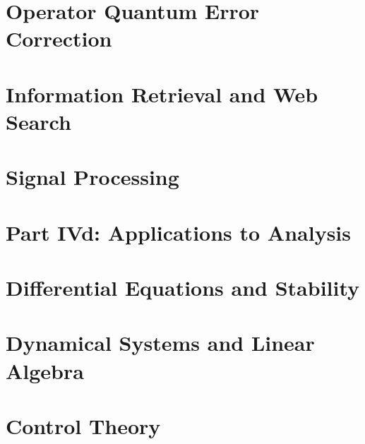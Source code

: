 \documentclass[a4paper]{article}
\begin{document}
\section{Operator Quantum Error Correction}

\section{Information Retrieval and Web Search}

\section{Signal Processing}

\section*{Part IVd: Applications to Analysis}

\section{Differential Equations and Stability}

\section{Dynamical Systems and Linear Algebra}

\section{Control Theory}

\newpage
\end{document}
